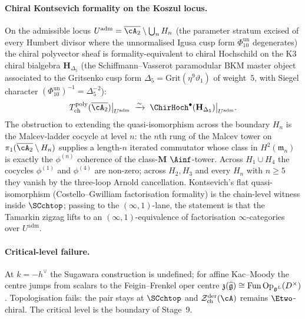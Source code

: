 \paragraph{Chiral Kontsevich formality on the Koszul locus.}
On the admissible locus
$U^{\mathrm{adm}} = \overline{\cA_2}\setminus\bigcup_n H_n$
(the parameter stratum excised of every Humbert divisor where
the unnormalised Igusa cusp form $\Phi_{10}^{\mathrm{un}}$ degenerates) the chiral polyvector
sheaf is formality-equivalent to chiral Hochschild on the K3 chiral
bialgebra $\mathbf{H}_{\Delta_5}$ (the Schiffmann--Vasserot paramodular
BKM master object associated to the Gritsenko cusp form
$\Delta_5 = \mathrm{Grit}(\eta^9\vartheta_1)$ of weight~$5$, with
Siegel character $(\Phi_{10}^{\mathrm{un}})^{-1}=\Delta_5^{-2}$):
\[
 T^{\mathrm{poly}}_{\mathrm{ch}}(\overline{\cA_2})\big|_{U^{\mathrm{adm}}}
 \;\xrightarrow{\sim}\;
 \ChirHoch^\bullet(\mathbf{H}_{\Delta_5})\big|_{U^{\mathrm{adm}}}.
\]
The obstruction to extending the quasi-isomorphism across the
boundary $H_n$ is the Malcev-ladder cocycle at level $n$: the
$n$th rung of the Malcev tower on
$\pi_1(\overline{\cA_2}\setminus H_n)$ supplies a
length-$n$ iterated commutator whose class in
$H^2(\mathfrak{m}_n)$ is exactly the $\phi^{(n)}$ coherence of
the class-$\mathbf{M}$ $\Ainf$-tower. Across $H_1\cup H_4$ the
cocycles $\phi^{(1)}$ and $\phi^{(4)}$ are non-zero; across
$H_2, H_3$ and every $H_n$ with $n \geq 5$ they vanish by the
three-loop Arnold cancellation. Kontsevich's flat
quasi-isomorphism (Costello--Gwilliam factorisation formality)
is the chain-level witness inside $\SCchtop$; passing to the
$(\infty,1)$-lane, the statement is that the Tamarkin zigzag
lifts to an $(\infty,1)$-equivalence of factorisation
$\infty$-categories over $U^{\mathrm{adm}}$.

\paragraph{Critical-level failure.}
At $k = -h^\vee$ the Sugawara construction is undefined; for
affine Kac--Moody the centre jumps from scalars to the
Feigin--Frenkel oper centre
$\mathfrak{z}(\widehat{\mathfrak{g}}) \cong
\operatorname{Fun}\operatorname{Op}_{\mathfrak{g}^L}(D^\times)$.
Topologisation fails: the pair stays at $\SCchtop$ and
$\cZ^{\mathrm{der}}_{\mathrm{ch}}(\cA)$ remains $\Etwo$-chiral.
The critical level is the boundary of Stage~9.


